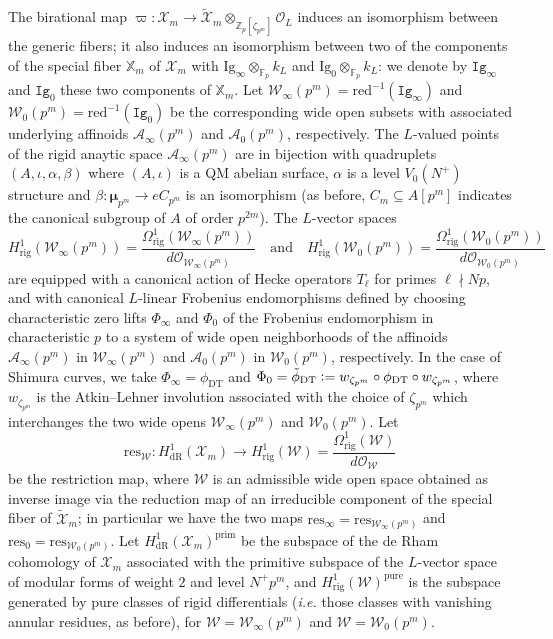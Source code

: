 \documentclass[a4paper,11pt]{amsart}
\numberwithin{equation}{section}
\theoremstyle{plain}
\theoremstyle{definition}
\theoremstyle{remark}
\newcommand{\Z}{\mathbb Z}
\newcommand{\F}{\mathbb F}
\newcommand{\defeq}{\vcentcolon=}
\begin{document}
The birational map $\varpi:\mathscr{X}_m\rightarrow \widetilde{\mathcal{X}}_m\otimes_{\Z_p[\zeta_{p^m}]}\mathcal{O}_L$ induces an isomorphism between the generic fibers; it also induces an isomorphism between two of the components of the special fiber $\mathbb{X}_m$ of $\mathscr{X}_m$ 
with $\mathrm{Ig}_\infty\otimes_{\F_p}k_L$ and $\mathrm{Ig}_0\otimes_{\F_p}k_L$: we denote by $\mathtt{Ig}_\infty$ and $\mathtt{Ig}_0$ these two components of $\mathbb{X}_m$.  
Let $\mathcal{W}_\infty(p^m)=\mathrm{red}^{-1}(\mathtt{Ig}_\infty)$ and $\mathcal{W}_0(p^m)=\mathrm{red}^{-1}(\mathtt{Ig}_0)$ be the corresponding wide open subsets with associated underlying affinoids $\mathcal{A}_\infty(p^m)$ and $\mathcal{A}_0(p^m)$, respectively. The $L$-valued points of the rigid anaytic space $\mathcal{A}_\infty(p^m)$ are in bijection with quadruplets $(A,\iota,\alpha,\beta) $ where $(A,\iota)$ is a QM abelian surface, $\alpha$ is a level $V_0(N^+)$ structure and $\beta\colon\boldsymbol{\mu}_{p^m}\rightarrow eC_{p^m}$ is an isomorphism (as before, $C_{m}\subseteq A[p^m]$ indicates the 
canonical subgroup of $A$ of order $p^{2m}$).  
The $L$-vector spaces 
\[H^1_\mathrm{rig}(\mathcal{W}_\infty(p^m))=\frac{\Omega^1_\mathrm{rig}(\mathcal{W}_\infty(p^m))}{d\mathcal{O}_{\mathcal{W}_\infty(p^m)}}\quad\text{and}\quad H^1_\mathrm{rig}(\mathcal{W}_0(p^m))=\frac{\Omega^1_\mathrm{rig}(\mathcal{W}_0(p^m))}{d\mathcal{O}_{\mathcal{W}_0(p^m)}}\] are equipped with a canonical action of Hecke operators $T_\ell$ for primes $\ell\nmid Np$, and with canonical $L$-linear Frobenius endomorphisms defined by choosing characteristic zero lifts $\Phi_\infty$ and $\Phi_0$ of the Frobenius endomorphism in characteristic $p$ to a system of wide open neighborhoods of the affinoids $\mathcal{A}_\infty(p^m)$ in $\mathcal{W}_\infty(p^m)$ and  $\mathcal{A}_0(p^m)$ in $\mathcal{W}_0(p^m)$, respectively.
In the case of Shimura curves, we take $\Phi_\infty=\phi_{\mathrm{DT}}$ and $\Phi_0=\tilde{\phi}_{\mathrm{DT}}\defeq w_{\zeta_{p^m}}\circ\phi_{\mathrm{DT}}\circ w_{\zeta_{p^m}}$, where $w_{\zeta_{p^m}}$ is the Atkin--Lehner involution associated with the choice of $\zeta_{p^m}$ which interchanges the two wide opens $\mathcal{W}_\infty(p^m)$ and $\mathcal{W}_0(p^m)$. Let 
\[\mathrm{res}_\mathcal{W}\colon H^1_\mathrm{dR}(\mathscr{X}_m)\longrightarrow H^1_\mathrm{rig}(\mathcal{W})=\frac{\Omega^1_\mathrm{rig}(\mathcal{W})}{d\mathcal{O}_{\mathcal{W}}}\] 
be the restriction map, where $\mathcal{W}$ is an admissible wide open space obtained as inverse image via the reduction map of an irreducible component of the special fiber of $\widetilde{\mathcal{X}}_m$; in particular we have the two maps $\mathrm{res}_\infty=\mathrm{res}_{\mathcal{W}_\infty(p^m)}$ 
and $\mathrm{res}_0=\mathrm{res}_{\mathcal{W}_0(p^m)}$. Let $H^1_\mathrm{dR}(\mathscr{X}_m)^\mathrm{prim}$ be the subspace of the de Rham cohomology of $\mathscr{X}_m$ associated with the primitive subspace of the $L$-vector space of modular forms of weight $2$ and level $N^+p^m$, and $H^1_\mathrm{rig}(\mathcal{W})^\mathrm{pure}$ is the subspace generated by pure classes of rigid differentials (\emph{i.e.} those classes with vanishing annular residues, as before), for $\mathcal{W}=\mathcal{W}_\infty(p^m)$ and $\mathcal{W}=\mathcal{W}_0(p^m)$.  
\end{document}

